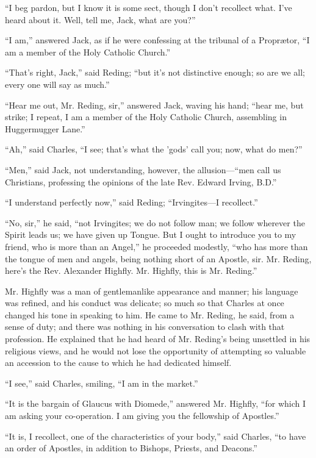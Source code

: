 ``I beg pardon, but I know it is some sect, though I don't
recollect what. I've heard about it. Well, tell me, Jack, what are
you?''

``I am,'' answered Jack, as if he were confessing at the
tribunal of a Proprætor, ``I am a member of the Holy Catholic
Church.''

``That's right, Jack,'' said Reding; ``but it's not
distinctive enough; so are we all; every one will say as much.''

``Hear me out, Mr. Reding, sir,'' answered Jack, waving his
hand; ``hear me, but strike; I repeat, I am a member of the Holy
Catholic Church, assembling in Huggermugger Lane.''

``Ah,'' said Charles, ``I see; that's what the 'gods'
call you; now, what do men?''

``Men,'' said Jack, not understanding, however, the
allusion—``men call us Christians, professing the opinions of
the late Rev. Edward Irving, B.D.''

``I understand perfectly now,'' said Reding; ``Irvingites—I
recollect.''

``No, sir,'' he said, ``not Irvingites; we do not
follow man; we follow wherever the Spirit leads us; we have given up
Tongue. But I ought to introduce you to my friend, who is more than an
Angel,'' he proceeded modestly, ``who has more than the tongue
of men and angels, being nothing short of an Apostle, sir. Mr. Reding, here's the Rev. Alexander Highfly. Mr. Highfly, this is Mr.
Reding.''

Mr. Highfly was a man of gentlemanlike appearance and manner; his
language was refined, and his conduct was delicate; so much so that
Charles at once changed his tone in speaking to him. He came to Mr.
Reding, he said, from a sense of duty; and there was nothing in his
conversation to clash with that profession. He explained that he had
heard of Mr. Reding's being unsettled in his religious views, and he
would not lose the opportunity of attempting so valuable an accession
to the cause to which he had dedicated himself.

``I see,'' said Charles, smiling, ``I am in the
market.''

``It is the bargain of Glaucus with Diomede,'' answered Mr.
Highfly, ``for which I am asking your co-operation. I am giving
you the fellowship of Apostles.''

``It is, I recollect, one of the characteristics of your
body,'' said Charles, ``to have an order of Apostles, in
addition to Bishops, Priests, and Deacons.''

